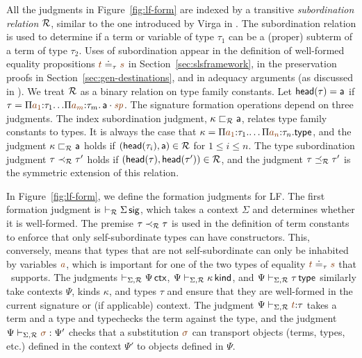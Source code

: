 All the judgments in Figure~\ref{fig:lf-form} are indexed by a
transitive {\it subordination relation} $\mathcal R$, similar to the one
introduced by Virga in \cite{virga99higherorder}. The subordination
relation is used to determine if a term or variable of type $\tau_1$ can
be a (proper) subterm of a term of type $\tau_2$. Uses of
subordination appear in the definition of well-formed equality
propositions $\lf t \doteq_\tau \lf s$ in
Section~\ref{sec:slsframework}, in the preservation proofs in
Section~\ref{sec:gen-destinations}, and in adequacy arguments (as
discussed in \cite{harper07mechanizing}). We treat $\mathcal R$ as a
binary relation on type family constants.  Let ${\sf head}(\tau) =
{\sf a}$ if $\tau =
\lfpi{a_1}{\tau_{1}}{\,.\,.\lfpi{a_{m}}{\tau_{m}}{\,\lfroot{\sf
      a}{\spi}}}$. The signature formation operations depend on three
judgments. The index subordination judgment, $\kappa \sqsubset_\mathcal R
{\sf a}$, relates type family constants to types.
%
It is always the case that $\kappa =
\lfpi{a_1}{\tau_1}{\ldots\lfpi{a_n}{\tau_n}{\sf type}}$, and the
judgment $\kappa \sqsubset_\mathcal R {\sf a}$ holds if $({\sf
  head}(\tau_i), {\sf a}) \in \mathcal R$ for $1 \leq i \leq n$.
%
The type subordination judgment $\tau \prec_\mathcal R \tau'$ holds if
$({\sf head}(\tau), {\sf head}(\tau')) \in \mathcal R$, and the judgment
$\tau \preceq_\mathcal R \tau'$ is the symmetric extension of this
relation.

In Figure~\ref{fig:lf-form}, we define the formation judgments 
for LF. The first formation judgment is $\vdash_\mathcal R
\Sigma\,{\sf sig}$, which takes a context $\Sigma$ and determines
whether it is well-formed.  The premise $\tau \prec_\mathcal R \tau$ is
used in the definition of term constants to enforce that only
self-subordinate types can have constructors. This, conversely, means
that types that are not self-subordinate can only be inhabited by
variables $\lf{a}$, which is important for one of the two types of
equality $\lf{t} \doteq_\tau \lf{s}$ that \sls~supports. The judgments
$\vdash_{\Sigma,\mathcal R} \Psi\,{\sf ctx}$, $\Psi
\vdash_{\Sigma,\mathcal R} \kappa\,{\sf kind}$, and $\Psi
\vdash_{\Sigma,\mathcal R} \tau\,{\sf type}$ similarly take contexts
$\Psi$, kinds $\kappa$, and types $\tau$ and ensure that they are
well-formed in the current signature or (if applicable) context.  The
judgment $\Psi \vdash_{\Sigma,\subord} \lf{t}{:} \tau$ takes a term
and a type and typechecks the term against the type, and the judgment
$\Psi \vdash_{\Sigma,\subord} \lf{\sigma} : \Psi'$ checks that a
substitution $\lf{\sigma}$ can transport objects (terms, types, etc.)
defined in the context $\Psi'$ to objects defined in $\Psi$.

